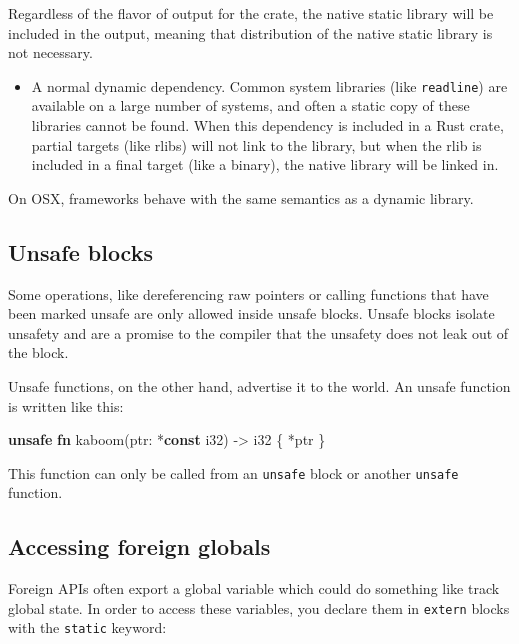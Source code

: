\documentclass[a4paper,]{book}
\newenvironment{Shaded}{\begin{snugshade}}{\end{snugshade}}
\newcommand{\KeywordTok}[1]{\textcolor[rgb]{0.13,0.29,0.53}{\textbf{{#1}}}}
\newcommand{\DataTypeTok}[1]{\textcolor[rgb]{0.13,0.29,0.53}{{#1}}}
\newcommand{\NormalTok}[1]{{#1}}
\providecommand{\tightlist}{%
  \setlength{\itemsep}{0pt}\setlength{\parskip}{0pt}}
\begin{document}
Regardless of the flavor of output for the crate, the native static
library will be included in the output, meaning that distribution of the
native static library is not necessary.

\begin{itemize}
\tightlist
\item
  A normal dynamic dependency. Common system libraries (like
  \texttt{readline}) are available on a large number of systems, and
  often a static copy of these libraries cannot be found. When this
  dependency is included in a Rust crate, partial targets (like rlibs)
  will not link to the library, but when the rlib is included in a final
  target (like a binary), the native library will be linked in.
\end{itemize}

On OSX, frameworks behave with the same semantics as a dynamic library.

\subsection{Unsafe blocks}\label{unsafe-blocks}

Some operations, like dereferencing raw pointers or calling functions
that have been marked unsafe are only allowed inside unsafe blocks.
Unsafe blocks isolate unsafety and are a promise to the compiler that
the unsafety does not leak out of the block.

Unsafe functions, on the other hand, advertise it to the world. An
unsafe function is written like this:

\begin{Shaded}
\begin{Highlighting}[]
\KeywordTok{unsafe} \KeywordTok{fn} \NormalTok{kaboom(ptr: *}\KeywordTok{const} \DataTypeTok{i32}\NormalTok{) -> }\DataTypeTok{i32} \NormalTok{\{ *ptr \}}
\end{Highlighting}
\end{Shaded}

This function can only be called from an \texttt{unsafe} block or
another \texttt{unsafe} function.

\subsection{Accessing foreign globals}\label{accessing-foreign-globals}

Foreign APIs often export a global variable which could do something
like track global state. In order to access these variables, you declare
them in \texttt{extern} blocks with the \texttt{static} keyword:
\end{document}
